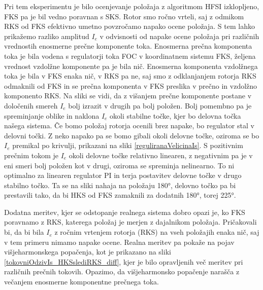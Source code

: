 \documentclass[a4paper,twoside,openright,12pt,slovene]{book}
\begin{document}
Pri tem eksperimentu je bilo ocenjevanje položaja z algoritmom HFSI izklopljeno, FKS pa je bil vedno poravnan s SKS. Rotor smo ročno vrteli, saj z odmikom RKS od FKS efektivno umetno povzročamo napako ocene položaja. S tem lahko prikažemo 
razliko amplitud $I_e$ v odvisnosti od napake ocene položaja pri različnih vrednostih enosmerne prečne komponente toka. 
Enosmerna prečna komponenta toka je bila vodena s regulatorji toka FOC v koordinatnem sistemu FKS, željena vrednost vzdolžne
komponente pa je bila nič. Enosmerna komponenta vzdolžnega toka je bila v FKS enaka nič, v RKS pa ne, saj smo z odklanjanjem rotorja RKS odmaknili od FKS in se prečna komponenta v FKS preslika v
prečno in vzdolžno komponento RKS. Na sliki se vidi, da z višanjem prečne komponente postane v določenih smereh $I_e$ bolj izrazit v drugih pa bolj položen. Bolj pomembno pa je spreminjanje oblike in
naklona $I_e$ okoli stabilne točke, kjer bo delovna točka našega sistema. Če bomo položaj rotorja ocenili brez napake, bo regulator stal v delovni točki. Z neko napako pa se bomo gibali okoli delovne točke, 
oziroma se bo $I_e$ premikal po krivulji, prikazani na sliki \ref{reguliranaVelicinaIs}. S pozitivnim prečnim tokom je $I_e$ okoli delovne točke relativno linearen, z negativnim pa je v eni smeri bolj položen
kot v drugi, oziroma se spreminja nelinearno. To ni optimalno za linearen regulator PI in terja postavitev delovne točke v drugo stabilno točko. Ta se na sliki nahaja na položaju 180°, delovno točko pa bi prestavili
tako, da bi HKS od FKS zamaknili za dodatnih 180°, torej 225°.

Dodatna meritev, kjer se odstopanje realnega sistema dobro opazi je, ko FKS poravnamo z RKS, katerega položaj je merjen z dajalnikom položaja. Pričakovali bi, da bi bila $I_e$ z ročnim vrtenjem rotorja (RKS)
na vseh položajih enaka nič, saj v tem primeru nimamo napake ocene. Realna meritev pa pokaže na pojav višjeharmonskega popačenja, kot je prikazano na sliki \ref{tokovniOdzivIs_HKSslediRKS_diff}, kjer
je bilo opravljenih več meritev pri različnih prečnih tokovih. Opazimo, da višjeharmonsko popačenje narašča z večanjem enosmerne komponentne prečnega toka.
\end{document}
